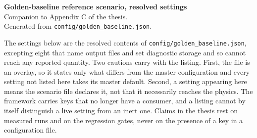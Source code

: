 \documentclass[10pt,a4paper]{article}
\begin{document}
\begin{center}
{\large\bfseries Golden-baseline reference scenario, resolved settings}\\[4pt]
Companion to Appendix C of the thesis.\\
Generated from \texttt{config/golden\_baseline.json}.
\end{center}

\vspace{1em}

\noindent
The settings below are the resolved contents of
\texttt{config/golden\_baseline.json}, excepting eight that name output files and set
diagnostic storage and so cannot reach any reported quantity. Two cautions carry with
the listing. First, the file is an overlay, so it states only what differs from the
master configuration and every setting not listed here takes its master default.
Second, a setting appearing here means the scenario file declares it, not that it
necessarily reaches the physics. The framework carries keys that no longer have a
consumer, and a listing cannot by itself distinguish a live setting from an inert one.
Claims in the thesis rest on measured runs and on the regression gates, never on the
presence of a key in a configuration file.

\vspace{1em}


\end{document}
